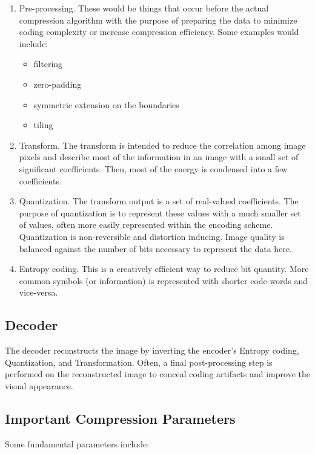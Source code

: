 \documentclass[11pt,a4paper]{article}
\begin{document}
\begin{enumerate}
\item Pre-processing. These would be things that occur before the actual compression algorithm with the purpose of preparing the data to minimize coding complexity or increase compression efficiency. Some examples would include:
	\begin{itemize}
	\item filtering
	\item zero-padding
	\item symmetric extension on the boundaries
	\item tiling
	\end{itemize}
\item Transform. The transform is intended to reduce the correlation among image pixels and describe most of the information in an image with a small set of significant coefficients. Then, most of the energy is condensed into a few coefficients.
\item Quantization. The transform output is a set of real-valued coefficients. The purpose of quantization is to represent these values with a much smaller set of values, often more easily represented within the encoding scheme. Quantization is non-reversible and distortion inducing. Image quality is balanced against the number of bits necessary to represent the data here.
\item Entropy coding. This is a creatively efficient way to reduce bit quantity. More common symbols (or information) is represented with shorter code-words and vice-versa.
\end{enumerate}

\subsection{Decoder}
The decoder reconstructs the image by inverting the encoder's Entropy coding, Quantization, and Transformation. Often, a final post-processing step is performed on the reconstructed image to conceal coding artifacts and improve the visual appearance.

\subsection{Important Compression Parameters}
Some fundamental parameters include:
\end{document}
